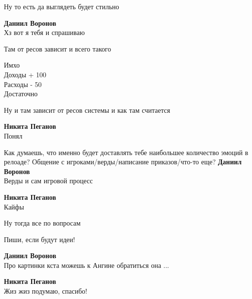 \begin{tabbing}
Ну то есть да выглядеть будет стильно

\textbf{Даниил Воронов} \\
Хз вот я тебя и спрашиваю

Там от ресов зависит и всего такого

Имхо \\
Доходы + 100 \\
Расходы - 50 \\
Достаточно

Ну и там зависит от ресов системы и как там считается

\textbf{Никита Пеганов} \\
Понял

Как думаешь, что именно будет доставлять тебе наибольшее количество эмоций в релоаде? Общение с игроками/верды/написание приказов/что-то еще?
\textbf{Даниил Воронов} \\
Верды и сам игровой процесс

\textbf{Никита Пеганов} \\
Кайфы

Ну тогда все по вопросам

Пиши, если будут идеи!

\textbf{Даниил Воронов} \\
Про картинки кста можешь к Ангине обратиться она ...

\textbf{Никита Пеганов} \\
Жиз жиз подумаю, спасибо!
\end{tabbing}